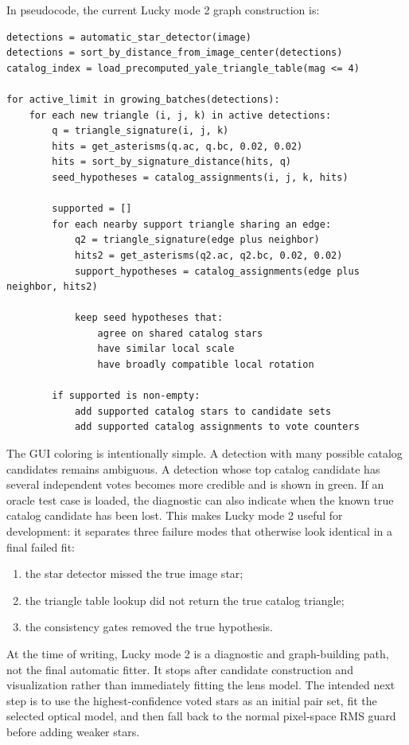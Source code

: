 \documentclass[11pt]{article}
\begin{document}
In pseudocode, the current Lucky mode 2 graph construction is:
\begin{lstlisting}[language={},caption={Current Lucky mode 2 asterism-graph search.}]
detections = automatic_star_detector(image)
detections = sort_by_distance_from_image_center(detections)
catalog_index = load_precomputed_yale_triangle_table(mag <= 4)

for active_limit in growing_batches(detections):
    for each new triangle (i, j, k) in active detections:
        q = triangle_signature(i, j, k)
        hits = get_asterisms(q.ac, q.bc, 0.02, 0.02)
        hits = sort_by_signature_distance(hits, q)
        seed_hypotheses = catalog_assignments(i, j, k, hits)

        supported = []
        for each nearby support triangle sharing an edge:
            q2 = triangle_signature(edge plus neighbor)
            hits2 = get_asterisms(q2.ac, q2.bc, 0.02, 0.02)
            support_hypotheses = catalog_assignments(edge plus neighbor, hits2)

            keep seed hypotheses that:
                agree on shared catalog stars
                have similar local scale
                have broadly compatible local rotation

        if supported is non-empty:
            add supported catalog stars to candidate sets
            add supported catalog assignments to vote counters
\end{lstlisting}

The GUI coloring is intentionally simple. A detection with many possible
catalog candidates remains ambiguous. A detection whose top catalog candidate
has several independent votes becomes more credible and is shown in green.
If an oracle test case is loaded, the diagnostic can also indicate when the
known true catalog candidate has been lost. This makes Lucky mode 2 useful for
development: it separates three failure modes that otherwise look identical in
a final failed fit:
\begin{enumerate}
  \item the star detector missed the true image star;
  \item the triangle table lookup did not return the true catalog triangle;
  \item the consistency gates removed the true hypothesis.
\end{enumerate}

At the time of writing, Lucky mode 2 is a diagnostic and graph-building path,
not the final automatic fitter. It stops after candidate construction and
visualization rather than immediately fitting the lens model. The intended
next step is to use the highest-confidence voted stars as an initial pair set,
fit the selected optical model, and then fall back to the normal pixel-space
RMS guard before adding weaker stars.
\end{document}
